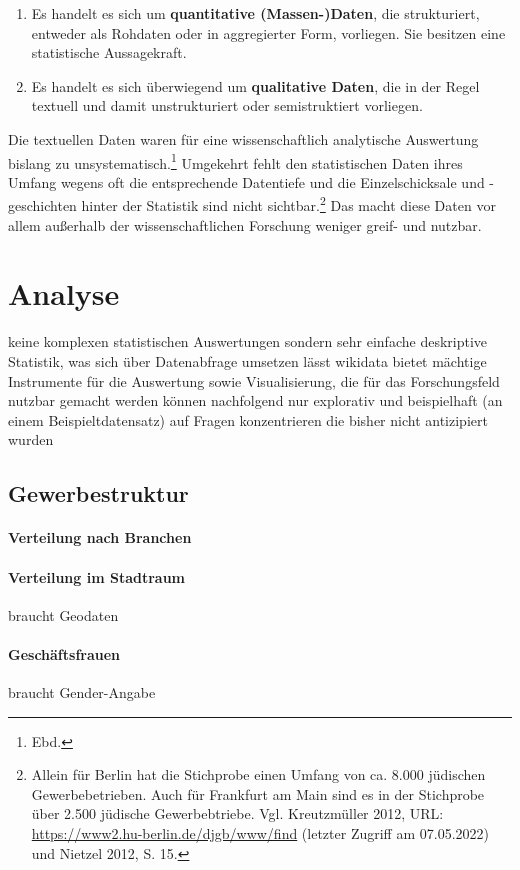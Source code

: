 \begin{enumerate}
    \item Es handelt es sich um \textbf{quantitative (Massen-)Daten}, die strukturiert, entweder als Rohdaten oder in aggregierter Form, vorliegen. Sie besitzen eine statistische Aussagekraft.
    \item Es handelt es sich überwiegend um \textbf{qualitative Daten}, die in der Regel textuell und damit unstrukturiert oder semistruktiert vorliegen.
\end{enumerate}

Die textuellen Daten waren für eine wissenschaftlich analytische Auswertung bislang zu unsystematisch.\footnote{Ebd.} Umgekehrt fehlt den statistischen Daten ihres Umfang wegens oft die entsprechende Datentiefe und die Einzelschicksale und -geschichten hinter der Statistik sind nicht sichtbar.\footnote{Allein für Berlin hat die Stichprobe einen Umfang von ca. 8.000 jüdischen Gewerbebetrieben. Auch für Frankfurt am Main sind es in der Stichprobe über 2.500 jüdische Gewerbebtriebe. Vgl. Kreutzmüller 2012, URL: \url{https://www2.hu-berlin.de/djgb/www/find} (letzter Zugriff am 07.05.2022) und Nietzel 2012, S. 15.} Das macht diese Daten vor allem außerhalb der wissenschaftlichen Forschung weniger greif- und nutzbar. 

\section{Analyse}
keine komplexen statistischen Auswertungen sondern sehr einfache deskriptive Statistik, was sich über Datenabfrage umsetzen lässt
wikidata bietet mächtige Instrumente für die Auswertung sowie Visualisierung, die für das Forschungsfeld nutzbar gemacht werden können
nachfolgend nur explorativ und beispielhaft (an einem Beispieltdatensatz) auf Fragen konzentrieren die bisher nicht antizipiert wurden
\subsection{Gewerbestruktur}
\paragraph{Verteilung nach Branchen}
\paragraph{Verteilung im Stadtraum}
braucht Geodaten
\paragraph{Geschäftsfrauen}
braucht Gender-Angabe
